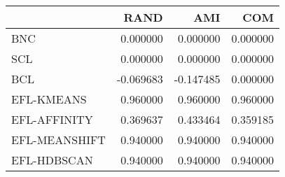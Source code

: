 \begin{tabular}{lrrr}
\toprule
 & RAND & AMI & COM \\
\midrule
BNC & 0.000000 & 0.000000 & 0.000000 \\
SCL & 0.000000 & 0.000000 & 0.000000 \\
BCL & -0.069683 & -0.147485 & 0.000000 \\
EFL-KMEANS & 0.960000 & 0.960000 & 0.960000 \\
EFL-AFFINITY & 0.369637 & 0.433464 & 0.359185 \\
EFL-MEANSHIFT & 0.940000 & 0.940000 & 0.940000 \\
EFL-HDBSCAN & 0.940000 & 0.940000 & 0.940000 \\
\bottomrule
\end{tabular}
